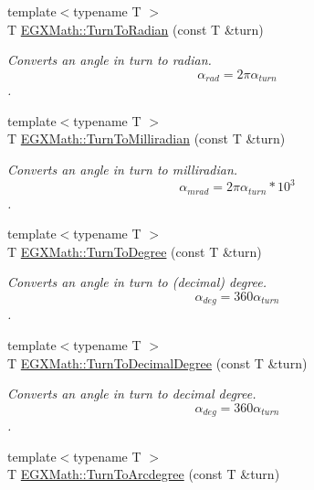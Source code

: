 \begin{DoxyCompactItemize}
\item 
{\footnotesize template$<$typename T $>$ }\\T \mbox{\hyperlink{group___e_g_x_math-_conversions-_angle_conversions-_turn_ga72e6d3c46ebfc25f7be5050136d8df16}{E\+G\+X\+Math\+::\+Turn\+To\+Radian}} (const T \&turn)
\begin{DoxyCompactList}\small\item\em Converts an angle in turn to radian. \[\alpha_{rad}=2\pi\alpha_{turn}\]. \end{DoxyCompactList}\item 
{\footnotesize template$<$typename T $>$ }\\T \mbox{\hyperlink{group___e_g_x_math-_conversions-_angle_conversions-_turn_ga2aea2621472294ce4c25ac7e55db51c6}{E\+G\+X\+Math\+::\+Turn\+To\+Milliradian}} (const T \&turn)
\begin{DoxyCompactList}\small\item\em Converts an angle in turn to milliradian. \[\alpha_{mrad}=2\pi\alpha_{turn}*10^3\]. \end{DoxyCompactList}\item 
{\footnotesize template$<$typename T $>$ }\\T \mbox{\hyperlink{group___e_g_x_math-_conversions-_angle_conversions-_turn_ga19eceb6db54a1cf17789639c2a869cb9}{E\+G\+X\+Math\+::\+Turn\+To\+Degree}} (const T \&turn)
\begin{DoxyCompactList}\small\item\em Converts an angle in turn to (decimal) degree. \[\alpha_{deg}=360\alpha_{turn}\]. \end{DoxyCompactList}\item 
{\footnotesize template$<$typename T $>$ }\\T \mbox{\hyperlink{group___e_g_x_math-_conversions-_angle_conversions-_turn_ga79231536255e77fb7a158b99a30c1767}{E\+G\+X\+Math\+::\+Turn\+To\+Decimal\+Degree}} (const T \&turn)
\begin{DoxyCompactList}\small\item\em Converts an angle in turn to decimal degree. \[\alpha_{deg}=360\alpha_{turn}\]. \end{DoxyCompactList}\item 
{\footnotesize template$<$typename T $>$ }\\T \mbox{\hyperlink{group___e_g_x_math-_conversions-_angle_conversions-_turn_ga7bdc3a81ce316dd47b1a3179489fa195}{E\+G\+X\+Math\+::\+Turn\+To\+Arcdegree}} (const T \&turn)

\end{DoxyCompactItemize}
